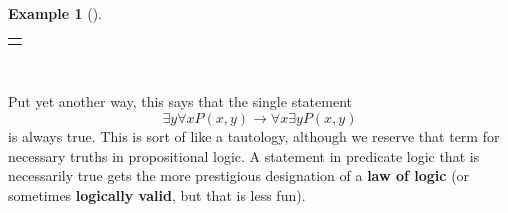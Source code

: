 \documentclass[10pt,]{book}
\newcommand{\terminology}[1]{\textbf{#1}}
\theoremstyle{plain}
\theoremstyle{definition}
\theoremstyle{definition}
\newtheorem{example}[theorem]{Example}
\theoremstyle{definition}
\numberwithin{equation}{chapter}
\newlength{\panelmax}
\def\imp{\rightarrow}
\begin{document}
\begin{example}[]
{%
\setlength{\tabcolsep}{0\linewidth}
\par\medskip\noindent
\begin{tabular}{@{}*{1}{c}@{}}
\begin{minipage}[c][\panelmax][t]{1\linewidth}\usebox{\panelboxAtabular}\end{minipage}\end{tabular}\\
}%
\par
\hypertarget{p-2347}{}%
Put yet another way, this says that the single statement%
\begin{equation*}
\exists y \forall x P(x,y) \imp \forall x \exists y P(x,y)
\end{equation*}
is always true.  This is sort of like a tautology, although we reserve that term for necessary truths in propositional logic.  A statement in predicate logic that is necessarily true gets the more prestigious designation of a \terminology{law of logic} (or sometimes \terminology{logically valid}, but that is less fun).%
\end{example}
\typeout{************************************************}
\typeout{************************************************}
\end{document}
